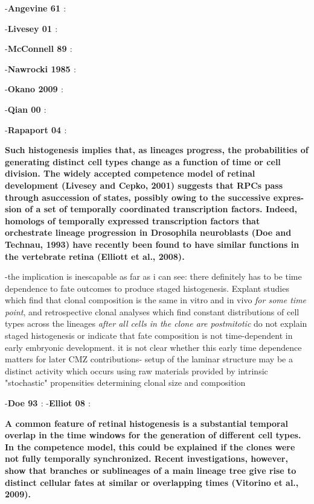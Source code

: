 \bigskip

-\textbf{Angevine 61 \cite{Angevine1961}}: 

-\textbf{Livesey 01 \cite{Livesey2001}}: 

-\textbf{McConnell 89 \cite{McConnell1989}}: 

-\textbf{Nawrocki 1985 \cite{Nawrocki1985}}: 

-\textbf{Okano 2009 \cite{Okano2009}}: 

-\textbf{Qian 00 \cite{Qian2000}}: 

-\textbf{Rapaport 04 \cite{Rapaport2004}}: 

\bigskip

\textbf{
Such histogenesis implies that, as lineages progress, the probabilities of generating
distinct cell types change as a function of time or cell division.
The widely accepted competence model of retinal development
(Livesey and Cepko, 2001) suggests that RPCs pass through
asuccession of states, possibly owing to the successive expres-
sion of a set of temporally coordinated transcription factors.
Indeed, homologs of temporally expressed transcription factors
that orchestrate lineage progression in Drosophila neuroblasts
(Doe and Technau, 1993) have recently been found to have
similar functions in the vertebrate retina (Elliott et al., 2008).
}

\bigskip

-the implication is inescapable as far as i can see: there definitely has to be time dependence to fate outcomes to produce staged histogenesis. Explant studies which find that clonal composition is the same in vitro and in vivo \textit{for some time point}, and retrospective clonal analyses which find constant distributions of cell types across the lineages \textit{after all cells in the clone are postmitotic} do not explain staged histogenesis or indicate that fate composition is not time-dependent in early embryonic development. it is not clear whether this early time dependence matters for later CMZ contributions- setup of the laminar structure may be a distinct activity which occurs using raw materials provided by intrinsic "stochastic" propensities determining clonal size and composition

\bigskip

-\textbf{Doe 93 \cite{Doe1993}}: 
-\textbf{Elliot 08 \cite{Elliot2008}}:

\bigskip

\textbf{
A common feature of retinal histogenesis is a substantial temporal
overlap in the time windows for the generation of different cell
types. In the competence model, this could be explained if
the clones were not fully temporally synchronized.
 Recent investigations, however, show that branches or sublineages of
a main lineage tree give rise to distinct cellular fates at similar
or overlapping times (Vitorino et al., 2009).}

